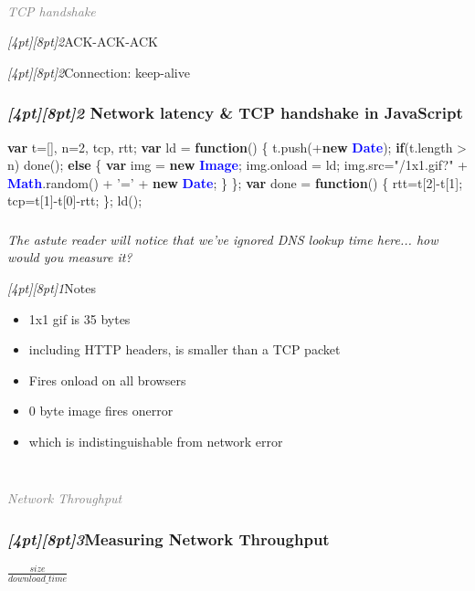 \documentclass{beamer}
\newcommand{\sn}[1]{\textrm{\textit{\Huge{\raisebox{-3pt}[4pt][8pt]{\textcolor{f2elblue}{#1}}}}}\hspace{4pt}}
\newcommand{\innersplash}[1]{
  \begin{center}
    \large \textrm{\textit{ #1 } }
  \end{center}
}
\newcommand{\splashslide}[2][{}]{
  \begin{frame}
  \frametitle{#1}
  \innersplash{#2}
  \end{frame}
}
\newcommand{\leadinslide}[2]{
  \splashslide{
     {\fontsize{150}{20}\selectfont{\raisebox{0pt}[90pt][0pt]{\textcolor{light-gray}{#1}}}} \\ \huge \textcolor{gray}{#2}
  }
}
\def\green<#1>#2{\textcolor<#1>{dark-green}{\textbf<#1>{#2}}}
\def\blue<#1>#2{\textcolor<#1>{blue}{\textbf<#1>{#2}}}
\begin{document}
\leadinslide{2}{TCP handshake}

\begin{frame}{\sn{2}ACK-ACK-ACK}
\end{frame}

\begin{frame}{\sn{2}Connection: keep-alive}
\end{frame}

\begin{frame}[fragile]
\frametitle{\sn{2} Network latency \& TCP handshake in JavaScript}
\vspace{-.3cm}
\begin{semiverbatim}
\green<1>{var} t=[], n=2, tcp, rtt;
\green<1>{var} ld = \green<1>{function}() \{
   t.push(+\green<1>{new} \blue<1>{Date});
   \green<1>{if}(t.length > n) 
     done();
   \green<1>{else} \{
     \green<1>{var} img = \green<1>{new} \blue<1>{Image};
     img.onload = ld;
     img.src="/1x1.gif?" + \blue<1>{Math}.random()
                         + '=' + \green<1>{new} \blue<1>{Date};
   \}
\};
\green<1>{var} done = \green<1>{function}() \{
  rtt=t[2]-t[1];
  tcp=t[1]-t[0]-rtt;
\};
ld();
\end{semiverbatim}
\end{frame}

\splashslide{The astute reader will notice that we've ignored DNS lookup time here... how would you measure it?}

\begin{frame}{\sn{1}Notes}
\begin{itemize}
  \item 1x1 gif is 35 bytes
  \item including HTTP headers, is smaller than a TCP packet
  \item Fires onload on all browsers
  \item 0 byte image fires onerror
  \item which is indistinguishable from network error
\end{itemize}
\end{frame}

\leadinslide{3}{Network Throughput}

\splashslide[\sn{3}Measuring Network Throughput]{\Large{\( \frac{size}{download\_time} \)}}
\end{document}
